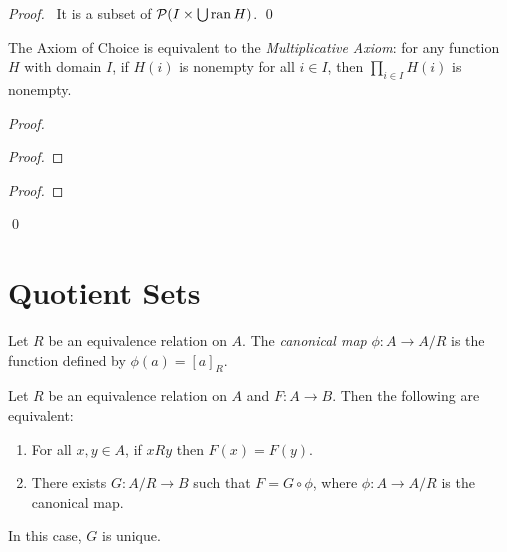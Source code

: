\begin{proof}
    \pf\ It is a subset of $\mathcal{P}(I \times \bigcup \operatorname{ran} H)$. \qed
\end{proof}

\begin{theorem}
    The Axiom of Choice is equivalent to the \emph{Multiplicative Axiom}: for any function $H$ with domain $I$,
    if $H(i)$ is nonempty for all $i \in I$, then $\prod_{i \in I} H(i)$ is nonempty.
\end{theorem}

\begin{proof}
    \pf
    \begin{proof}
    \end{proof}
    \begin{proof}
    \end{proof}
    \qed
\end{proof}

\section{Quotient Sets}

\begin{definition}
    Let $R$ be an equivalence relation on $A$. The \emph{canonical map} $\phi : A \rightarrow A / R$
    is the function defined by $\phi(a) = [a]_R$.
\end{definition}

\begin{theorem}
    Let $R$ be an equivalence relation on $A$ and $F : A \rightarrow B$.
    Then the following are equivalent:
    \begin{enumerate}
        \item For all $x, y \in A$, if $xRy$ then $F(x) = F(y)$.
        \item There exists $G : A / R \rightarrow B$ such that 
        $F = G \circ \phi$, where $\phi : A \rightarrow A / R$ is the canonical map.
    \end{enumerate}
    In this case, $G$ is unique.
\end{theorem}

